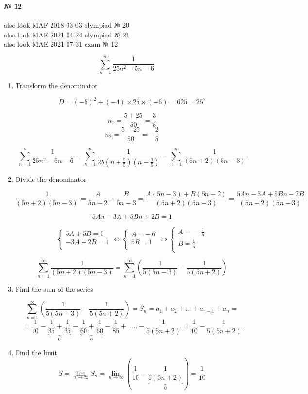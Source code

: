 \documentclass{article}
\begin{document}
\textbf{№ 12} 
\\
\\ also look MAF 2018-03-03 olympiad № 20
\\ also look MAE 2021-04-24 olympiad № 21
\\ also look MAE 2021-07-31 exam № 12

$$\sum_{n=1}^{\infty} \frac{1}{25n^2-5n-6}$$

\begin{enumerate}

\item Transform the denominator

$$D = (-5)^2 + (-4)\times25\times(-6)=625=25^2$$

$$n_1 = \frac{5+25}{50}=\frac{3}{5}$$
$$n_2 = \frac{5-25}{50}=-\frac{2}{5}$$

$$\sum_{n=1}^{\infty} \frac{1}{25n^2-5n-6} = \sum_{n=1}^{\infty} \frac{1}{25(n+\frac{2}{5})(n-\frac{3}{5})} = \sum_{n=1}^{\infty} \frac{1}{(5n+2)(5n-3)}$$

\item Divide the denominator

$$\frac{1}{(5n+2)(5n-3)} = \frac{A}{5n+2} + \frac{B}{5n-3} 
= \frac{A(5n-3)+B(5n+2)}{(5n+2)(5n-3)} 
= \frac{5An-3A+5Bn+2B}{(5n+2)(5n-3)}$$

$$5An-3A+5Bn+2B = 1$$

$$
\left\{
  \begin{array}{ccc}
    5A + 5B = 0 \\
    -3A+2B = 1 \\
  \end{array}\Leftrightarrow
\right.
\left\{
  \begin{array}{ccc}
    A = -B \\
    5B = 1 \\
  \end{array}\Leftrightarrow
\right.
\left\{
  \begin{array}{ccc}
    A = =\frac{1}{5} \\
    B = \frac{1}{5} \\
  \end{array}
\right.
$$

$$ \sum_{n=1}^{\infty} \frac{1}{(5n+2)(5n-3)} = 
\sum_{n=1}^{\infty} \left(\frac{1}{5(5n-3)} - \frac{1}{5(5n+2)}\right) $$

\item Find the sum of the series

$$ \sum_{n=1}^{\infty} \left(\frac{1}{5(5n-3)} - \frac{1}{5(5n+2)}\right) 
= S_n = a_1+a_2+...+a_{n-1}+a_n = $$
$$ = \frac{1}{10} - \underbrace{\frac{1}{35} + \frac{1}{35}}_{0} - \underbrace{\frac{1}{60} + \frac{1}{60}}_{0} - \frac{1}{85} + ..... - \frac{1}{5(5n+2)} = \frac{1}{10} - \frac{1}{5(5n+2)}$$

\item Find the limit
$$S = \lim_{n\to\infty} S_n 
= \lim_{n\to\infty} \left(\frac{1}{10} - \underbrace{\frac{1}{5(5n+2)}}_{0}\right) 
= \frac{1}{10} $$


\end{enumerate}
\end{document}
